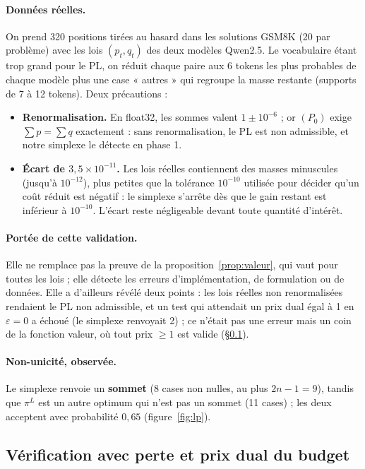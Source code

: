 \documentclass[11pt,a4paper]{article}
\theoremstyle{plain}
\theoremstyle{definition}
\begin{document}
\paragraph{Données réelles.} On prend 320 positions tirées au hasard dans les solutions GSM8K (20 par problème) avec les lois $(p_t,q_t)$ des deux modèles Qwen2.5. Le vocabulaire étant trop grand pour le PL, on réduit chaque paire aux 6 tokens les plus probables de chaque modèle plus une case « autres » qui regroupe la masse restante (supports de 7 à 12 tokens). Deux précautions :
\begin{itemize}
\item \textbf{Renormalisation.} En float32, les sommes valent $1\pm10^{-6}$ ; or $(P_0)$ exige $\sum p=\sum q$ exactement : sans renormalisation, le PL est non admissible, et notre simplexe le détecte en phase 1.
\item \textbf{Écart de $3{,}5\times10^{-11}$.} Les lois réelles contiennent des masses minuscules (jusqu'à $10^{-12}$), plus petites que la tolérance $10^{-10}$ utilisée pour décider qu'un coût réduit est négatif : le simplexe s'arrête dès que le gain restant est inférieur à $10^{-10}$. L'écart reste négligeable devant toute quantité d'intérêt.
\end{itemize}

\paragraph{Portée de cette validation.} Elle ne remplace pas la preuve de la proposition~\ref{prop:valeur}, qui vaut pour toutes les lois ; elle détecte les erreurs d'implémentation, de formulation ou de données. Elle a d'ailleurs révélé deux points : les lois réelles non renormalisées rendaient le PL non admissible, et un test qui attendait un prix dual égal à 1 en $\varepsilon=0$ a échoué (le simplexe renvoyait 2) ; ce n'était pas une erreur mais un coin de la fonction valeur, où tout prix $\ge1$ est valide (§\ref{sec:perte}).

\paragraph{Non-unicité, observée.} Le simplexe renvoie un \textbf{sommet} (8 cases non nulles, au plus $2n-1=9$), tandis que $\pi^L$ est un autre optimum qui n'est pas un sommet (11 cases) ; les deux acceptent avec probabilité $0{,}65$ (figure~\ref{fig:lp}).

\subsection{Vérification avec perte et prix dual du budget}\label{sec:perte}
\end{document}
